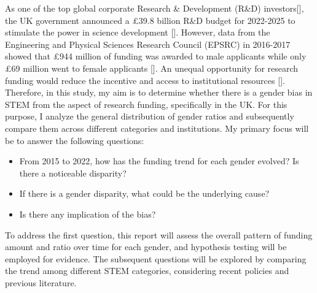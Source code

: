 As one of the top global corporate Research \& Development (R\&D) investors[\cite{GII2022}], the UK government announced a £39.8 billion R\&D budget for 2022-2025 to stimulate the power in science development [\cite{funding2025}]. However, data from the Engineering and Physical Sciences Research Council (EPSRC) in 2016-2017 showed that £944 million of funding was awarded to male applicants while only £69 million went to female applicants [\cite{jebsen2020review}]. An unequal opportunity for research funding would reduce the incentive and access to institutional resources [\cite{cruz2022gender}].  Therefore, in this study, my aim is to determine whether there is a gender bias in STEM from the aspect of research funding, specifically in the UK. For this purpose, I analyze the general distribution of gender ratios and subsequently compare them across different categories and institutions. My primary focus will be to answer the following questions:
\begin{itemize}
    \item From 2015 to 2022, how has the funding trend for each gender evolved? Is there a noticeable disparity?
    \item If there is a gender disparity, what could be the underlying cause?
    \item Is there any implication of the bias?
\end{itemize}
\bigbreak
\noindent To address the first question, this report will assess the overall pattern of funding amount and ratio over time for each gender, and hypothesis testing will be employed for evidence. The subsequent questions will be explored by comparing the trend among different STEM categories, considering recent policies and previous literature.
